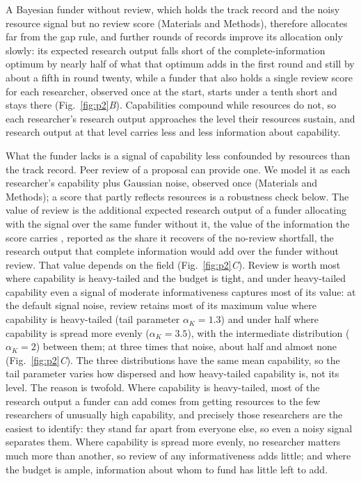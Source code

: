 \documentclass[9pt,twocolumn,twoside]{pnas-new}
\begin{document}
A Bayesian funder without review, which holds the track record and the noisy resource signal but no review score (Materials and Methods), therefore allocates far from the gap rule, and further rounds of records improve its allocation only slowly: its expected research output falls short of the complete-information optimum by nearly half of what that optimum adds in the first round and still by about a fifth in round twenty, while a funder that also holds a single review score for each researcher, observed once at the start, starts under a tenth short and stays there (Fig.~\ref{fig:p2}\textit{B}). Capabilities compound while resources do not, so each researcher's research output approaches the level their resources sustain, and research output at that level carries less and less information about capability.

What the funder lacks is a signal of capability less confounded by resources than the track record. Peer review of a proposal can provide one. We model it as each researcher's capability plus Gaussian noise, observed once (Materials and Methods); a score that partly reflects resources is a robustness check below. The value of review is the additional expected research output of a funder allocating with the signal over the same funder without it, the value of the information the score carries \citep{Howard1966}, reported as the share it recovers of the no-review shortfall, the research output that complete information would add over the funder without review. That value depends on the field (Fig.~\ref{fig:p2}\textit{C}). Review is worth most where capability is heavy-tailed and the budget is tight, and under heavy-tailed capability even a signal of moderate informativeness captures most of its value: at the default signal noise, review retains most of its maximum value where capability is heavy-tailed (tail parameter $\alpha_K = 1.3$) and under half where capability is spread more evenly ($\alpha_K = 3.5$), with the intermediate distribution ($\alpha_K = 2$) between them; at three times that noise, about half and almost none (Fig.~\ref{fig:p2}\textit{C}). The three distributions have the same mean capability, so the tail parameter varies how dispersed and how heavy-tailed capability is, not its level. The reason is twofold. Where capability is heavy-tailed, most of the research output a funder can add comes from getting resources to the few researchers of unusually high capability, and precisely those researchers are the easiest to identify: they stand far apart from everyone else, so even a noisy signal separates them. Where capability is spread more evenly, no researcher matters much more than another, so review of any informativeness adds little; and where the budget is ample, information about whom to fund has little left to add.
\end{document}
